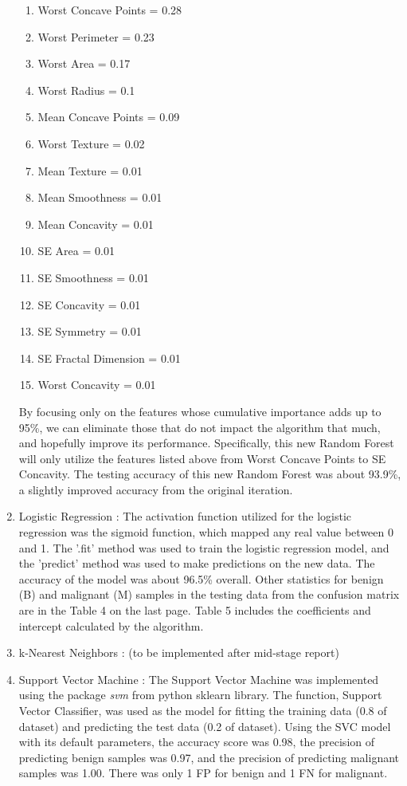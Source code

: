 \documentclass[conference]{IEEEtran}
\begin{document}
\begin{enumerate}
    \begin{enumerate}
        \item Worst Concave Points = 0.28
        \item Worst Perimeter = 0.23
        \item Worst Area = 0.17
        \item Worst Radius = 0.1
        \item Mean Concave Points = 0.09
        \item Worst Texture = 0.02
        \item Mean Texture = 0.01
        \item Mean Smoothness = 0.01
        \item Mean Concavity = 0.01
        \item SE Area = 0.01
        \item SE Smoothness = 0.01
        \item SE Concavity = 0.01
        \item SE Symmetry = 0.01
        \item SE Fractal Dimension = 0.01
        \item Worst Concavity = 0.01
    \end{enumerate}

    By focusing only on the features whose cumulative importance adds up to 95\%, we can eliminate those that do not impact the algorithm that much, and hopefully improve its performance. Specifically, this new Random Forest will only utilize the features listed above from Worst Concave Points to SE Concavity. The testing accuracy of this new Random Forest was about 93.9\%, a slightly improved accuracy from the original iteration.

    \item Logistic Regression : The activation function utilized for the logistic regression was the sigmoid function, which mapped any real value between 0 and 1. The '.fit' method was used to train the logistic regression model, and the 'predict' method was used to make predictions on the new data. The accuracy of the model was about 96.5\% overall. Other statistics for benign (B) and malignant (M) samples in the testing data from the confusion matrix are in the Table 4 on the last page. Table 5 includes the coefficients and intercept calculated by the algorithm.
    
    \item k-Nearest Neighbors : (to be implemented after mid-stage report)

    \item Support Vector Machine : The Support Vector Machine was implemented using the package {\em svm} from python sklearn library. The function, Support Vector Classifier, was used as the model for fitting the training data (0.8 of dataset) and predicting the test data (0.2 of dataset). Using the SVC model with its default parameters, the accuracy score was 0.98, the precision of predicting benign samples was 0.97, and the precision of predicting malignant samples was 1.00. There was only 1 FP for benign and 1 FN for malignant. 
	

\end{enumerate}
\end{document}
